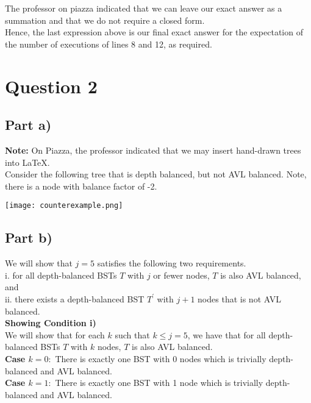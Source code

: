 \documentclass[12pt]{article}
\begin{document}
The professor on piazza indicated that we can leave our exact answer as a summation and that we do not require a closed form. \\

Hence, the last expression above is our final exact answer for the expectation of the number of executions of lines 8 and 12, as required. 
\newpage

\section*{Question 2}

\subsection*{Part a)}

\textbf{Note:} On Piazza, the professor indicated that we may insert hand-drawn trees into LaTeX. \\

Consider the following tree that is depth balanced, but not AVL balanced. Note, there is a node with balance factor of -2.

\texttt{[image: counterexample.png]} 

\subsection*{Part b)}

We will show that $j = 5$ satisfies the following two requirements. \\

i. for all depth-balanced BSTs $T$ with $j$ or fewer nodes, $T$ is also AVL balanced, and \\

ii. there exists a depth-balanced BST $T^\prime$ with $j+1$ nodes that is not AVL balanced. \\

\textbf{Showing Condition i)} \\

We will show that for each $k$ such that $k \leq j = 5$, we have that for all depth-balanced BSTs $T$ with $k$ nodes, $T$ is also AVL balanced. \\

\textbf{Case $k = 0:$} There is exactly one BST with 0 nodes which is trivially depth-balanced and AVL balanced. \\

\textbf{Case $k = 1:$} There is exactly one BST with 1 node which is trivially depth-balanced and AVL balanced. \\
\end{document}
